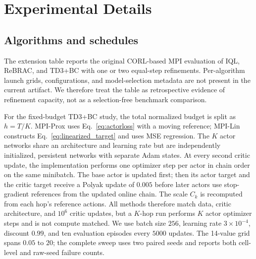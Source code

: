 \section{Experimental Details}
\label{app:experiments}

\subsection{Algorithms and schedules}
The extension table reports the original CORL-based MPI evaluation of IQL,
ReBRAC, and TD3+BC with one or two equal-step refinements. Per-algorithm launch
grids, configurations, and model-selection metadata are not present in the
current artifact. We therefore treat the table as retrospective evidence of
refinement capacity, not as a selection-free benchmark comparison.

For the fixed-budget TD3+BC study, the total normalized budget is split as
$h=T/K$. MPI-Prox uses Eq.~\eqref{eq:actorloss} with a moving reference;
MPI-Lin constructs Eq.~\eqref{eq:linearized_target} and uses MSE regression.
The $K$ actor networks share an architecture and learning rate but are
independently initialized, persistent networks with separate Adam states.
At every second critic update, the implementation performs one optimizer step
per actor in chain order on the same minibatch. The base actor is updated first;
then its actor target and the critic target receive a Polyak update of $0.005$
before later actors use stop-gradient references from the updated online chain.
The scale $C_k$ is recomputed from each hop's reference actions. All methods
therefore match data, critic architecture, and $10^6$ critic updates, but a
$K$-hop run performs $K$ actor optimizer steps and is not compute matched.
We use batch size $256$, learning rate $3\times10^{-4}$, discount $0.99$, and
ten evaluation episodes every $5000$ updates. The 14-value grid spans $0.05$ to
$20$; the complete sweep uses two paired seeds and reports both cell-level and raw-seed failure counts.

